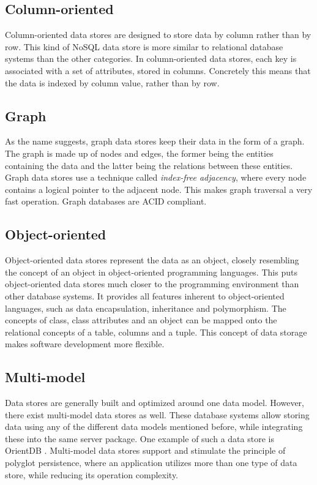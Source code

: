\subsection{Column-oriented}
\label{subsec:column-oriented}

Column-oriented data stores are designed to store data by column rather than by row.
This kind of NoSQL data store is more similar to relational database systems than the other categories.
In column-oriented data stores, each key is associated with a set of attributes, stored in columns.
Concretely this means that the data is indexed by column value, rather than by row.

\subsection{Graph}
\label{subsec:graph}

As the name suggests, graph data stores keep their data in the form of a graph.
The graph is made up of nodes and edges, the former being the entities containing the data and the latter being the relations between these entities.
Graph data stores use a technique called \textit{index-free adjacency}, where every node contains a logical pointer to the adjacent node.
This makes graph traversal a very fast operation. Graph databases are ACID compliant.

\subsection{Object-oriented}
\label{subsec:object-oriented}

Object-oriented data stores represent the data as an object, closely resembling the concept of an object in object-oriented programming languages.
This puts object-oriented data stores much closer to the programming environment than other database systems.
It provides all features inherent to object-oriented languages, such as data encapsulation, inheritance and polymorphism.
The concepts of class, class attributes and an object can be mapped onto the relational concepts of a table, columns and a tuple.
This concept of data storage makes software development more flexible.

\subsection{Multi-model}
\label{subsec:multi-model}
Data stores are generally built and optimized around one data model.
However, there exist multi-model data stores as well.
These database systems allow storing data using any of the different data models mentioned before, while integrating these into the same server package.
One example of such a data store is OrientDB \autocite{OrientDB2010}.
Multi-model data stores support and stimulate the principle of polyglot persistence, where an application utilizes more than one type of data store, while reducing its operation complexity.\\

